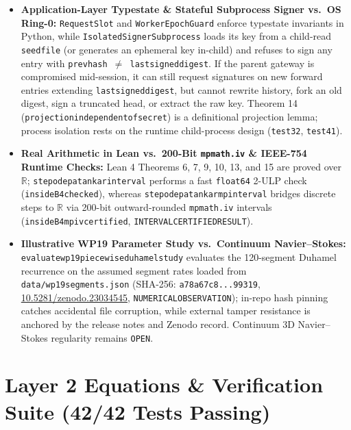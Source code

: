 \documentclass[10pt,letterpaper]{article}
\renewcommand{\_}{\textunderscore\allowbreak{}}
\begin{document}
\begin{itemize}
  \item \textbf{Application-Layer Typestate \& Stateful Subprocess Signer vs.\ OS Ring-0:} \texttt{RequestSlot} and \texttt{WorkerEpochGuard} enforce typestate invariants in Python, while \texttt{IsolatedSignerSubprocess} loads its key from a child-read \texttt{seed\_file} (or generates an ephemeral key in-child) and refuses to sign any entry with \texttt{prev\_hash $\neq$ last\_signed\_digest}. If the parent gateway is compromised mid-session, it can still request signatures on new forward entries extending \texttt{last\_signed\_digest}, but cannot rewrite history, fork an old digest, sign a truncated head, or extract the raw key. Theorem 14 (\texttt{projection\_independent\_of\_secret}) is a definitional projection lemma; process isolation rests on the runtime child-process design (\texttt{test\_32}, \texttt{test\_41}).
  \item \textbf{Real Arithmetic in Lean vs.\ 200-Bit \texttt{mpmath.iv} \& IEEE-754 Runtime Checks:} Lean 4 Theorems 6, 7, 9, 10, 13, and 15 are proved over $\mathbb{R}$; \texttt{step\_ode\_patankar\_interval} performs a fast \texttt{float64} 2-ULP check (\texttt{inside\_B4\_checked}), whereas \texttt{step\_ode\_patankar\_mp\_interval} bridges discrete steps to $\mathbb{R}$ via 200-bit outward-rounded \texttt{mpmath.iv} intervals (\texttt{inside\_B4\_mp\_iv\_certified}, \texttt{INTERVAL\_CERTIFIED\_RESULT}).
  \item \textbf{Illustrative WP19 Parameter Study vs.\ Continuum Navier--Stokes:} \texttt{evaluate\_wp19\_piecewise\_duhamel\_study} evaluates the 120-segment Duhamel recurrence on the assumed segment rates loaded from \texttt{data/wp19\_segments.json} (SHA-256: \texttt{a78a67c8...99319}, \href{https://doi.org/10.5281/zenodo.23034545}{10.5281/zenodo.23034545}, \texttt{NUMERICAL\_OBSERVATION}); in-repo hash pinning catches accidental file corruption, while external tamper resistance is anchored by the release notes and Zenodo record. Continuum 3D Navier--Stokes regularity remains \texttt{OPEN}.
\end{itemize}

\vspace{-0.3em}
\section{Layer 2 Equations \& Verification Suite (42/42 Tests Passing)}
\vspace{-0.2em}
\end{document}

